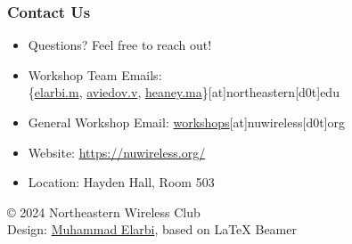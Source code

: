 \documentclass{beamer}
\begin{document}
\begin{frame}
    \frametitle{Contact Us}
    \begin{itemize}
        \item Questions? Feel free to reach out!
        \item Workshop Team Emails: \\
        \{\href{mailto:elarbi.m@northeastern.edu}{elarbi.m}, 
        \href{mailto:aviedov.v@northeastern.edu}{aviedov.v}, 
        \href{mailto:heaney.ma@northeastern.edu}{heaney.ma}\}[at]northeastern[d0t]edu
        \item General Workshop Email: \href{mailto:workshops@nuwireless.org}{workshops}[at]nuwireless[d0t]org
        \item Website: \url{https://nuwireless.org/}
        \item Location: Hayden Hall, Room 503
    \end{itemize}
    \vspace{1cm}
    \begin{flushright}
        \footnotesize{© 2024 Northeastern Wireless Club} \\
        \footnotesize{Design: \href{https://melarbi.com}{Muhammad Elarbi}, based on LaTeX Beamer}
    \end{flushright}
\end{frame}

\end{document}
